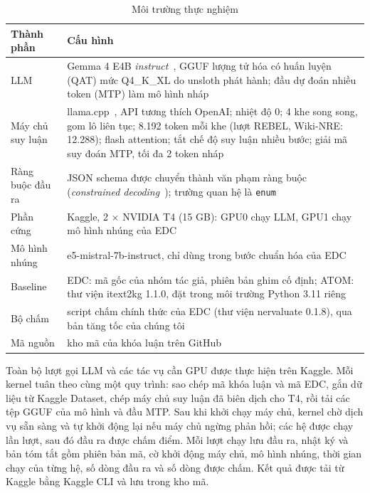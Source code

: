 \begin{table}[htbp]
\centering
\caption{Môi trường thực nghiệm}\label{tab:env}
\small
\begin{tabular}{>{\raggedright\arraybackslash}p{3.0cm} >{\raggedright\arraybackslash}p{11.9cm}}
\toprule
\textbf{Thành phần} & \textbf{Cấu hình} \\
\midrule
LLM & Gemma 4 E4B \textit{instruct}~\cite{gemma4}, GGUF lượng tử hóa có huấn luyện (QAT) mức Q4\_K\_XL do unsloth phát hành; đầu dự đoán nhiều token (MTP) làm mô hình nháp \\
Máy chủ suy luận & llama.cpp~\cite{llamacpp}, API tương thích OpenAI; nhiệt độ 0; 4 khe song song, gom lô liên tục; 8.192 token mỗi khe (lượt REBEL, Wiki-NRE: 12.288); flash attention; tắt chế độ suy luận nhiều bước; giải mã suy đoán MTP, tối đa 2 token nháp \\
Ràng buộc đầu ra & JSON schema được chuyển thành văn phạm ràng buộc (\textit{constrained decoding}~\cite{willard2023outlines}); trường quan hệ là \texttt{enum} \\
Phần cứng & Kaggle, 2 $\times$ NVIDIA T4 (15 GB): GPU0 chạy LLM, GPU1 chạy mô hình nhúng của EDC \\
Mô hình nhúng & e5-mistral-7b-instruct, chỉ dùng trong bước chuẩn hóa của EDC \\
Baseline & EDC: mã gốc của nhóm tác giả, phiên bản ghim cố định; ATOM: thư viện itext2kg 1.1.0, đặt trong môi trường Python 3.11 riêng \\
Bộ chấm & script chấm chính thức của EDC (thư viện nervaluate 0.1.8), qua bản tăng tốc của chúng tôi \\
Mã nguồn & kho mã của khóa luận trên GitHub \\
\bottomrule
\end{tabular}
\end{table}

Toàn bộ lượt gọi LLM và các tác vụ cần GPU được thực hiện trên Kaggle. Mỗi kernel tuân theo cùng một quy trình: sao chép mã khóa luận và mã EDC, gắn dữ liệu từ Kaggle Dataset, chép máy chủ suy luận đã biên dịch cho T4, rồi tải các tệp GGUF của mô hình và đầu MTP.
Sau khi khởi chạy máy chủ, kernel chờ dịch vụ sẵn sàng và tự khởi động lại nếu máy chủ ngừng phản hồi; các hệ được chạy lần lượt, sau đó đầu ra được chấm điểm.
Mỗi lượt chạy lưu đầu ra, nhật ký và bản tóm tắt gồm phiên bản mã, cờ khởi động máy chủ, mô hình nhúng, thời gian chạy của từng hệ, số dòng đầu ra và số dòng được chấm. Kết quả được tải từ Kaggle bằng Kaggle CLI và lưu trong kho mã.

